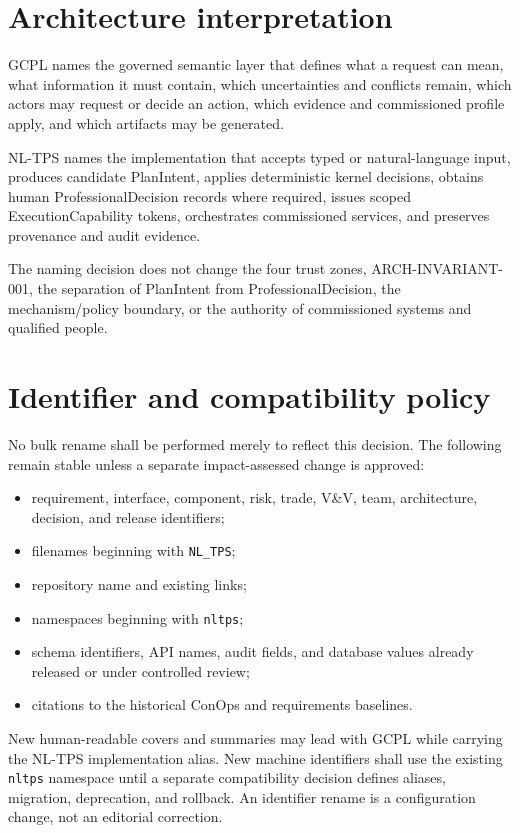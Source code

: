 \documentclass[11pt,letterpaper]{article}
\begin{document}
\section{Architecture interpretation}

GCPL names the governed semantic layer that defines what a request can mean, what information it must contain, which uncertainties and conflicts remain, which actors may request or decide an action, which evidence and commissioned profile apply, and which artifacts may be generated.

NL-TPS names the implementation that accepts typed or natural-language input, produces candidate PlanIntent, applies deterministic kernel decisions, obtains human ProfessionalDecision records where required, issues scoped ExecutionCapability tokens, orchestrates commissioned services, and preserves provenance and audit evidence.

The naming decision does not change the four trust zones, ARCH-INVARIANT-001, the separation of PlanIntent from ProfessionalDecision, the mechanism/policy boundary, or the authority of commissioned systems and qualified people.

\section{Identifier and compatibility policy}

No bulk rename shall be performed merely to reflect this decision. The following remain stable unless a separate impact-assessed change is approved:

\begin{itemize}
\item requirement, interface, component, risk, trade, V\&V, team, architecture, decision, and release identifiers;
\item filenames beginning with \texttt{NL\_TPS};
\item repository name and existing links;
\item namespaces beginning with \texttt{nltps};
\item schema identifiers, API names, audit fields, and database values already released or under controlled review;
\item citations to the historical ConOps and requirements baselines.
\end{itemize}

New human-readable covers and summaries may lead with GCPL while carrying the NL-TPS implementation alias. New machine identifiers shall use the existing \texttt{nltps} namespace until a separate compatibility decision defines aliases, migration, deprecation, and rollback. An identifier rename is a configuration change, not an editorial correction.
\end{document}
